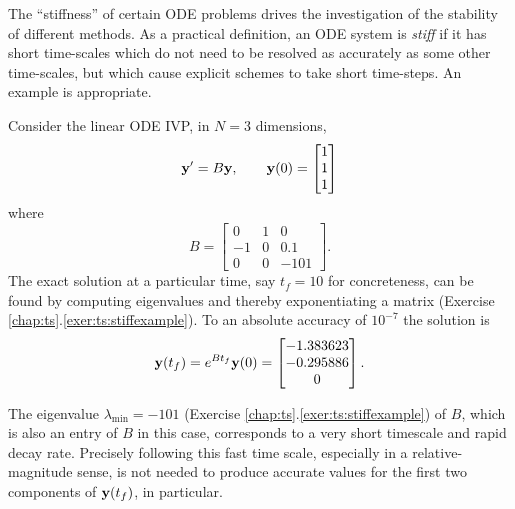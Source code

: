 The ``stiffness'' of certain ODE problems drives the investigation of the stability of different methods.  As a practical definition, an ODE system is \emph{stiff} if it has short time-scales which do not need to be resolved as accurately as some other time-scales, but which cause explicit schemes to take short time-steps.  An example is appropriate.

\noindent\hrulefill
\begin{example}  \label{ex:ts:odestiff}  Consider the linear ODE IVP, in $N=3$ dimensions,
\begin{equation}
   \mathbf{y}' = B \mathbf{y}, \qquad \mathbf{y}(0) = \begin{bmatrix} 1 \\ 1 \\ 1 \end{bmatrix} \label{eq:ts:stiffexample}
\end{equation}
where
\begin{equation}
   B = \begin{bmatrix} 0 & 1 & 0 \\
                      -1 & 0 & 0.1 \\
                       0 & 0 & -101 \end{bmatrix}. \label{eq:ts:stiffexamplematrix}
\end{equation}
The exact solution at a particular time, say $t_f=10$ for concreteness, can be found by computing eigenvalues and thereby exponentiating a matrix (Exercise \ref{chap:ts}.\ref{exer:ts:stiffexample}).  To an absolute accuracy of $10^{-7}$ the solution is
\begin{equation}
    \mathbf{y}(t_f) = e^{B t_f} \mathbf{y}(0) = \begin{bmatrix} -1.383623 \\
                                                 -0.295886 \\
                                                  0 \end{bmatrix}.\label{eq:ts:stiffsoln}
\end{equation}

The eigenvalue $\lambda_{\min}=-101$ (Exercise \ref{chap:ts}.\ref{exer:ts:stiffexample}) of $B$, which is also an entry of $B$ in this case, corresponds to a very short timescale and rapid decay rate.  Precisely following this fast time scale, especially in a relative-magnitude sense, is not needed to produce accurate values for the first two components of $\mathbf{y}(t_f)$, in particular.


\end{example}
